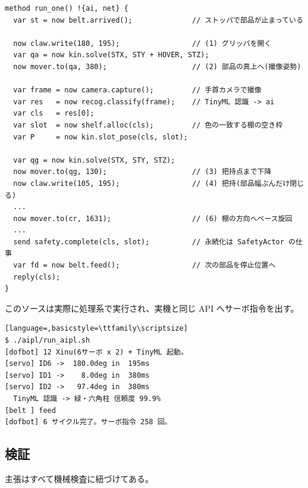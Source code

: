 \documentclass[11pt,a4paper]{article}
\begin{document}
\begin{lstlisting}[language=AIPL]
method run_one() !{ai, net} {
  var st = now belt.arrived();              // ストッパで部品が止まっている

  now claw.write(180, 195);                 // (1) グリッパを開く
  var qa = now kin.solve(STX, STY + HOVER, STZ);
  now mover.to(qa, 380);                    // (2) 部品の真上へ(撮像姿勢)

  var frame = now camera.capture();         // 手首カメラで撮像
  var res   = now recog.classify(frame);    // TinyML 認識 -> ai
  var cls   = res[0];
  var slot  = now shelf.alloc(cls);         // 色の一致する棚の空き枠
  var P     = now kin.slot_pose(cls, slot);

  var qg = now kin.solve(STX, STY, STZ);
  now mover.to(qg, 130);                    // (3) 把持点まで下降
  now claw.write(105, 195);                 // (4) 把持(部品幅ぶんだけ閉じる)
  ...
  now mover.to(cr, 1631);                   // (6) 棚の方向へベース旋回
  ...
  send safety.complete(cls, slot);          // 永続化は SafetyActor の仕事
  var fd = now belt.feed();                 // 次の部品を停止位置へ
  reply(cls);
}
\end{lstlisting}

\noindent
このソースは実際に処理系で実行され、実機と同じ API へサーボ指令を出す。

\begin{lstlisting}[language=,basicstyle=\ttfamily\scriptsize]
$ ./aipl/run_aipl.sh
[dofbot] 12 Xinu(6サーボ x 2) + TinyML 起動。
[servo] ID6 ->  180.0deg in  195ms
[servo] ID1 ->    8.0deg in  380ms
[servo] ID2 ->   97.4deg in  380ms
  TinyML 認識 -> 緑・六角柱 信頼度 99.9%
[belt ] feed
[dofbot] 6 サイクル完了。サーボ指令 258 回。
\end{lstlisting}

\subsection{検証}
主張はすべて機械検査に紐づけてある。
\end{document}
